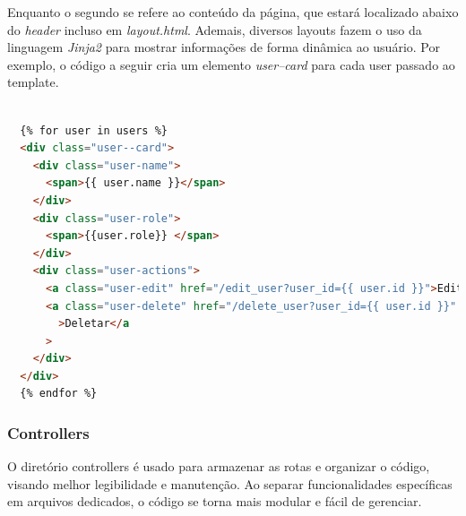 \documentclass[conference, a4paper, 12pt]{IEEEtran}
\begin{document}

      Enquanto o segundo se refere ao conteúdo da página, que estará localizado abaixo do \emph{header} incluso em \emph{layout.html}. Ademais, diversos layouts fazem o uso da linguagem \emph{Jinja2} para mostrar informações de forma dinâmica ao usuário. Por exemplo, o código a seguir cria um elemento \emph{user--card} para cada user passado ao template.

      \begin{lstlisting}[language=html, caption=Snippet de users/users.html]

  {% for user in users %}
  <div class="user--card">
    <div class="user-name">
      <span>{{ user.name }}</span>
    </div>
    <div class="user-role">
      <span>{{user.role}} </span>
    </div>
    <div class="user-actions">
      <a class="user-edit" href="/edit_user?user_id={{ user.id }}">Editar</a>
      <a class="user-delete" href="/delete_user?user_id={{ user.id }}"
        >Deletar</a
      >
    </div>
  </div>
  {% endfor %}

\end{lstlisting}



      \subsubsection{Controllers}
      O diretório controllers é usado para armazenar as rotas e organizar o código, visando melhor legibilidade e manutenção. Ao separar funcionalidades específicas em arquivos dedicados, o código se torna mais modular e fácil de gerenciar.
\end{document}
